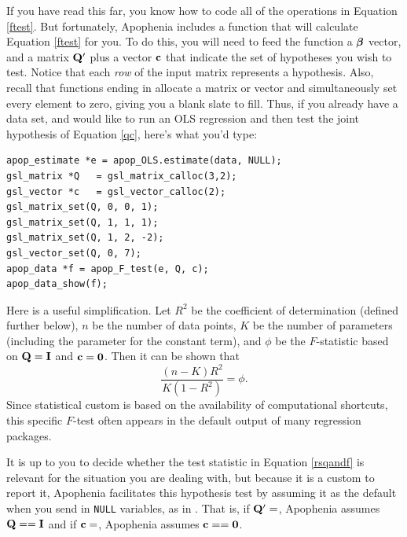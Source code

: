 If you have read this far, you know how to code all of the operations
in Equation \ref{ftest}.  But fortunately, 
Apophenia includes a function that will calculate Equation \ref{ftest}
for you.
To do this, you will need to feed the function a ${\mbox{\boldmath$\beta$}}$ vector, and a
matrix ${\bf Q}'$ plus a vector ${\bf c}$ that indicate the set of hypotheses
you wish to test. Notice that each {\em row} of the input matrix represents a
hypothesis. Also, recall that functions ending in  allocate
a matrix or vector and simultaneously set every element to zero, giving
you a blank slate to fill. Thus, if you already have a data set, and
would like to run an OLS regression and then test the joint hypothesis
of Equation \ref{qc}, here's what you'd type:
\begin{lstlisting}
apop_estimate *e = apop_OLS.estimate(data, NULL);
gsl_matrix *Q   = gsl_matrix_calloc(3,2);
gsl_vector *c   = gsl_vector_calloc(2);
gsl_matrix_set(Q, 0, 0, 1);
gsl_matrix_set(Q, 1, 1, 1);
gsl_matrix_set(Q, 1, 2, -2);
gsl_vector_set(Q, 0, 7);
apop_data *f = apop_F_test(e, Q, c);
apop_data_show(f);
\end{lstlisting}

Here is a useful simplification.
Let $R^2$ be the coefficient of determination (defined further below),
$n$ be the number of data points, $K$ be the number of parameters
(including the parameter for the constant term), and $\phi$ be the
$F$-statistic
based on ${\bf Q} = {\bf I}$ and ${\bf c} = {\bf 0}$. Then it can be shown that 
\begin{equation}
\frac{(n-K) R^2}{K (1-R^2)} = \phi.    \label{rsqandf}
\end{equation}
Since statistical custom is based on the availability of computational
shortcuts, this specific $F$-test often appears in the default output
of many regression packages.  


It is up to you
to decide whether the test statistic in Equation \ref{rsqandf} is
relevant for the situation you are dealing with, but because it
is a custom to report it, Apophenia facilitates this hypothesis
test by assuming it as the default when you send in {\tt NULL}
variables, as in . That is,
if ${\bf Q}'=$, Apophenia assumes ${\bf Q}=={\bf I}$ and if
${\bf c}=$, Apophenia assumes ${\bf c} == {\bf 0}$.

